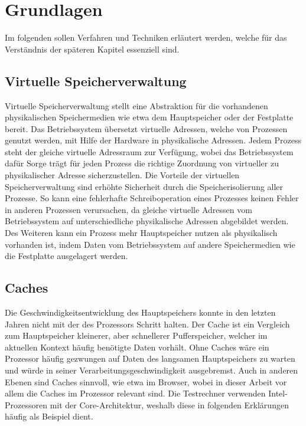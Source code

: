 \chapter{Grundlagen}
\label{chapter:basics}

Im folgenden sollen Verfahren und Techniken erläutert werden, welche für das Verständnis der späteren Kapitel essenziell sind.

\section{Virtuelle Speicherverwaltung}

Virtuelle Speicherverwaltung stellt eine Abstraktion für die vorhandenen physikalischen Speichermedien wie etwa dem Hauptspeicher oder der Festplatte bereit.
Das Betriebssystem übersetzt virtuelle Adressen, welche von Prozessen genutzt werden, mit Hilfe der Hardware in physikalische Adressen. Jedem Prozess steht der gleiche virtuelle Adressraum zur Verfügung, wobei das Betriebssystem dafür Sorge trägt für jeden Prozess die richtige Zuordnung von virtueller zu physikalischer Adresse sicherzustellen.
Die Vorteile der virtuellen Speicherverwaltung sind erhöhte Sicherheit durch die Speicherisolierung aller Prozesse. So kann eine fehlerhafte Schreiboperation eines Prozesses keinen Fehler in anderen Prozessen verursachen, da gleiche virtuelle Adressen vom Betriebssystem auf unterschiedliche physikalische Adressen abgebildet werden. Des Weiteren kann ein Prozess mehr Hauptspeicher nutzen als physikalisch vorhanden ist, indem Daten vom Betriebssystem auf andere Speichermedien wie die Festplatte ausgelagert werden.

\section{Caches}

Die Geschwindigkeitsentwicklung des Hauptspeichers konnte in den letzten Jahren nicht mit der des Prozessors Schritt halten. Der Cache ist ein Vergleich zum Hauptspeicher kleinerer, aber schnellerer Pufferspeicher, welcher im aktuellen Kontext häufig benötigte Daten vorhält. Ohne Caches wäre ein Prozessor häufig gezwungen auf Daten des langsamen Hauptspeichers zu warten und würde in seiner Verarbeitungsgeschwindigkeit ausgebremst. Auch in anderen Ebenen sind Caches sinnvoll, wie etwa im Browser, wobei in dieser Arbeit vor allem die Caches im Prozessor relevant sind. Die Testrechner verwenden Intel-Prozessoren mit der Core-Architektur, weshalb diese in folgenden Erklärungen häufig als Beispiel dient.

